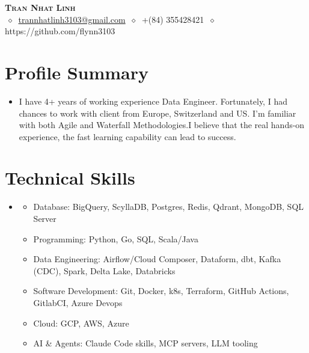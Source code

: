 \documentclass[letterpaper,11pt]{article}
\newcommand{\cvitem}[1]{
  \item\small{
    {#1\vspace{-2pt}}
  }
}
\newcommand{\cvheadingstart}{\begin{itemize}[leftmargin=0in, label={}]}
\newcommand{\cvheadingend}{\end{itemize}}
\newcommand{\cvitemstart}{\begin{itemize}\justifying}
\newcommand{\cvitemend}{\end{itemize}\vspace{-5pt}}
\begin{document}
\begin{center}
  \textbf{\LARGE\scshape Tran Nhat Linh} \\
  \vspace{1pt}\small
   $\ \diamond\ $ 
  \href{mailto:}{trannhatlinh3103@gmail.com}
  $\ \diamond\ $ 
  +(84) 355428421
   $\ \diamond\ $ 
  https://github.com/flynn3103
\end{center}


\section{Profile Summary}
\cvheadingstart
\item 
I have 4+ years of working experience Data Engineer. Fortunately, I had chances to work with client from Europe, Switzerland and US. I'm familiar with both Agile and Waterfall Methodologies.I believe that the real hands-on experience, the fast learning capability can lead to success.
\cvheadingend

\section{Technical Skills}
\cvheadingstart
\item
\cvitemstart
  \cvitem{Database: BigQuery, ScyllaDB, Postgres, Redis, Qdrant, MongoDB, SQL Server}
  \cvitem{Programming: Python, Go, SQL, Scala/Java}
  \cvitem{Data Engineering: Airflow/Cloud Composer, Dataform, dbt, Kafka (CDC), Spark, Delta Lake, Databricks}
  \cvitem{Software Development: Git, Docker, k8s, Terraform, GitHub Actions, GitlabCI, Azure Devops}
  \cvitem{Cloud: GCP, AWS, Azure}
  \cvitem{AI \& Agents: Claude Code skills, MCP servers, LLM tooling}
\cvitemend
\cvheadingend
\end{document}
